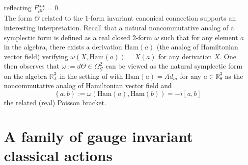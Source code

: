\documentclass[10pt]{book}
\theoremstyle{break}
\begin{document}
%
reflecting $F^{inv}_{\mu\nu}=0$. \\ 
The form $\Theta$ related to the 1-form invariant canonical connection supports an interesting interpretation. Recall %
that a natural noncommutative analog of a symplectic form is defined as a real closed 2-form $\omega$ such that for any element $a$ in the algebra, there exists a derivation $\text{Ham}(a)$ (the analog of Hamiltonian vector field) verifying $\omega(X,\text{Ham}(a))=X(a)$ for any derivation $X$. One then observes that $\omega:=d\Theta\in\Omega^2_\mathcal{G}$ can be viewed as the natural symplectic form on the algebra $\mathbb{R}^3_\lambda$ in the setting of %
with $\text{Ham}(a)=Ad_{ia}$ for any $a\in\mathbb{R}^3_\theta$ as the noncommutative analog of Hamiltonian vector field and 
\begin{equation}
\left\{a,b\right\}:=\omega\left(\text{Ham}(a),\text{Ham}(b)\right)=-i\left[a,b\right]%
\end{equation}
the related (real) Poisson bracket.\par


\section{A family of gauge invariant classical actions}
\end{document}
